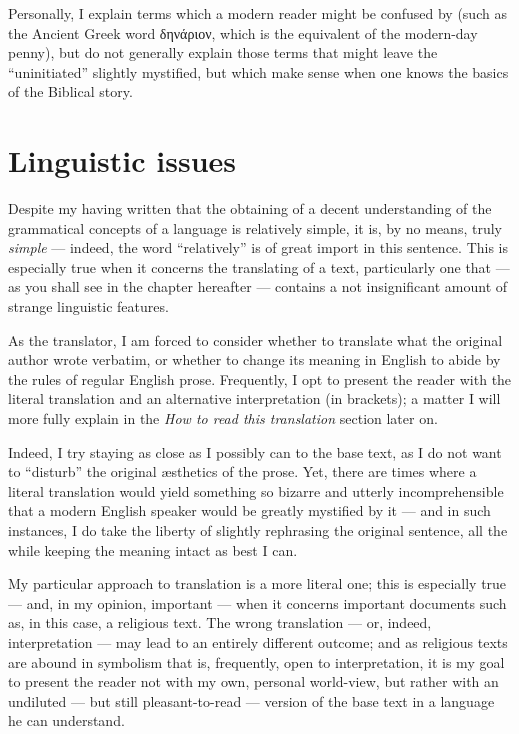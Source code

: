  Personally, I explain terms which a modern reader might be confused by (such as the Ancient Greek word δηνάριον, which is the equivalent of the modern-day penny), but do not generally explain those terms that might leave the ``uninitiated'' slightly mystified, but which make sense when one knows the basics of the Biblical story.
 
 \section*{Linguistic issues}
  
Despite my having written that the obtaining of a decent understanding of the grammatical concepts of a language is relatively simple, it is, by no means, truly \textit{simple} — indeed, the word ``relatively'' is of great import in this sentence. This is especially true when it concerns the translating of a text, particularly one that — as you shall see in the chapter hereafter — contains a not insignificant amount of strange linguistic features. 

As the translator, I am forced to consider whether to translate what the original author wrote verbatim, or whether to change its meaning in English to abide by the rules of regular English prose. Frequently, I opt to present the reader with the literal translation and an alternative interpretation (in brackets); a matter I will more fully explain in the \textit{How to read this translation} section later on. 

Indeed, I try staying as close as I possibly can to the base text, as I do not want to ``disturb'' the original \ae sthetics of the prose. Yet, there are times where a literal translation would yield something so bizarre and utterly incomprehensible that a modern English speaker would be greatly mystified by it — and in such instances, I do take the liberty of slightly rephrasing the original sentence, all the while keeping the meaning intact as best I can. 

My particular approach to translation is a more literal one; this is especially true — and, in my opinion, important — when it concerns important documents such as, in this case, a religious text. The wrong translation — or, indeed, interpretation — may lead to an entirely different outcome; and as religious texts are abound in symbolism that is, frequently, open to interpretation, it is my goal to present the reader not with my own, personal world-view, but rather with an undiluted — but still pleasant-to-read — version of the base text in a language he can understand.  

